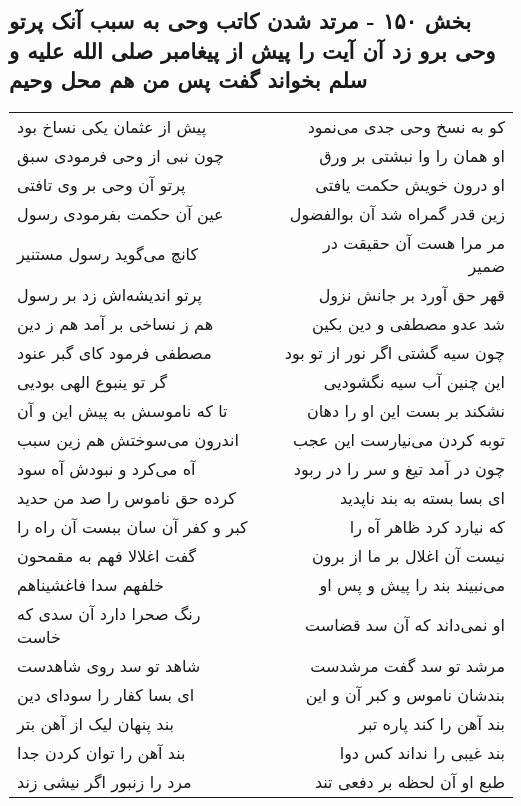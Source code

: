 \begin{center}
\section*{بخش ۱۵۰ - مرتد شدن کاتب وحی به سبب آنک پرتو وحی برو زد آن آیت را پیش از پیغامبر صلی الله علیه و سلم بخواند گفت پس من هم محل وحیم}
\label{sec:sh150}
\begin{longtable}{l p{0.5cm} r}
پیش از عثمان یکی نساخ بود
&&
کو به نسخ وحی جدی می‌نمود
\\
چون نبی از وحی فرمودی سبق
&&
او همان را وا نبشتی بر ورق
\\
پرتو آن وحی بر وی تافتی
&&
او درون خویش حکمت یافتی
\\
عین آن حکمت بفرمودی رسول
&&
زین قدر گمراه شد آن بوالفضول
\\
کانچ می‌گوید رسول مستنیر
&&
مر مرا هست آن حقیقت در ضمیر
\\
پرتو اندیشه‌اش زد بر رسول
&&
قهر حق آورد بر جانش نزول
\\
هم ز نساخی بر آمد هم ز دین
&&
شد عدو مصطفی و دین بکین
\\
مصطفی فرمود کای گبر عنود
&&
چون سیه گشتی اگر نور از تو بود
\\
گر تو ینبوع الهی بودیی
&&
این چنین آب سیه نگشودیی
\\
تا که ناموسش به پیش این و آن
&&
نشکند بر بست این او را دهان
\\
اندرون می‌سوختش هم زین سبب
&&
توبه کردن می‌نیارست این عجب
\\
آه می‌کرد و نبودش آه سود
&&
چون در آمد تیغ و سر را در ربود
\\
کرده حق ناموس را صد من حدید
&&
ای بسا بسته به بند ناپدید
\\
کبر و کفر آن سان ببست آن راه را
&&
که نیارد کرد ظاهر آه را
\\
گفت اغلالا فهم به مقمحون
&&
نیست آن اغلال بر ما از برون
\\
خلفهم سدا فاغشیناهم
&&
می‌نبیند بند را پیش و پس او
\\
رنگ صحرا دارد آن سدی که خاست
&&
او نمی‌داند که آن سد قضاست
\\
شاهد تو سد روی شاهدست
&&
مرشد تو سد گفت مرشدست
\\
ای بسا کفار را سودای دین
&&
بندشان ناموس و کبر آن و این
\\
بند پنهان لیک از آهن بتر
&&
بند آهن را کند پاره تبر
\\
بند آهن را توان کردن جدا
&&
بند غیبی را نداند کس دوا
\\
مرد را زنبور اگر نیشی زند
&&
طبع او آن لحظه بر دفعی تند

\end{longtable}
\end{center}
